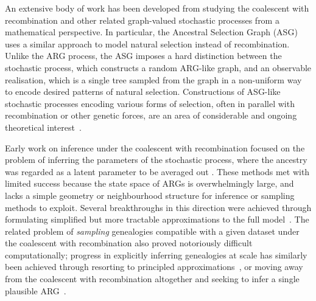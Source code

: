 \documentclass[9pt,twocolumn,twoside]{gsajnl}
\begin{document}
An extensive body of work has been developed from
studying the coalescent with recombination
and other related
graph-valued stochastic processes from a mathematical perspective.
In particular, the Ancestral Selection Graph
(ASG)~\citep{krone1997ancestral,neuhauser1997genealogy}
uses a similar approach to model natural selection instead of recombination.
Unlike the ARG process, the ASG imposes a hard distinction between the stochastic process,
which constructs a random ARG-like graph, and an observable realisation,
which is a single tree sampled from the graph in a non-uniform way to encode
desired patterns of natural selection.
Constructions of ASG-like stochastic processes encoding various
forms of selection, often in parallel with recombination or other genetic forces,
are an area of considerable and ongoing theoretical interest~\citep[e.g.][]{
neuhauser1999ancestral,
donnelly1999genealogical,
fearnhead2001perfect,
fearnhead2003ancestral,
etheridge2009coalescent,
baumdicker2014AGTG,
gonzalezcasanova2018duality,
koskela2019robust}.

Early work on inference under the coalescent with recombination
focused on the problem of
inferring the parameters of the
stochastic process, where the ancestry was regarded as a
latent parameter to be averaged out
\citep[e.g.][]{griffiths1996ancestral,kuhner2000maximum, nielsen2000estimation,
fearnhead2001estimating}.
These methods met with limited success
because the state space of ARGs is overwhelmingly large, and
lacks a simple geometry or neighbourhood structure for inference or
sampling methods to  exploit.
Several breakthroughs in this direction were achieved through
formulating simplified but more tractable approximations to the full
model~\citep{mcvean2005approximating,marjoram2006fast,li2011inference,
paul2011accurate,schiffels2014inferring}.
The related problem of \emph{sampling} genealogies compatible with a given
dataset under the coalescent with recombination also proved notoriously difficult
computationally; progress in explicitly inferring genealogies at scale
has similarly been achieved through resorting to principled
approximations~\citep{rasmussen2014genome,mahmoudi2022bayesian,deng2024robust},
or moving away from the coalescent with recombination altogether and seeking
to infer a single plausible ARG~\citep[e.g.][]{
minichiello2006mapping,kelleher2019inferring,speidel2019method}.
\end{document}
